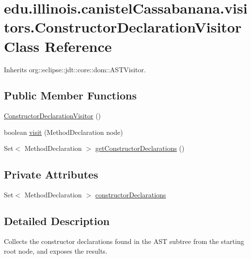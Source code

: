 \hypertarget{classedu_1_1illinois_1_1canistelCassabanana_1_1visitors_1_1ConstructorDeclarationVisitor}{
\section{edu.illinois.canistelCassabanana.visitors.ConstructorDeclarationVisitor Class Reference}
\label{classedu_1_1illinois_1_1canistelCassabanana_1_1visitors_1_1ConstructorDeclarationVisitor}
}


Inherits org::eclipse::jdt::core::dom::ASTVisitor.

\subsection*{Public Member Functions}
\begin{DoxyCompactItemize}
\item 
\hyperlink{classedu_1_1illinois_1_1canistelCassabanana_1_1visitors_1_1ConstructorDeclarationVisitor_ac5d0769146e570f94a92eb59f92f57c8}{ConstructorDeclarationVisitor} ()
\item 
boolean \hyperlink{classedu_1_1illinois_1_1canistelCassabanana_1_1visitors_1_1ConstructorDeclarationVisitor_afafd417f2801c19676e2d7c1b1b53b26}{visit} (MethodDeclaration node)
\item 
Set$<$ MethodDeclaration $>$ \hyperlink{classedu_1_1illinois_1_1canistelCassabanana_1_1visitors_1_1ConstructorDeclarationVisitor_a013cd441eb841119c3e29e0c669f6cb8}{getConstructorDeclarations} ()
\end{DoxyCompactItemize}
\subsection*{Private Attributes}
\begin{DoxyCompactItemize}
\item 
Set$<$ MethodDeclaration $>$ \hyperlink{classedu_1_1illinois_1_1canistelCassabanana_1_1visitors_1_1ConstructorDeclarationVisitor_a1b3b20e50f658bd0b2e3e8b189fc3119}{constructorDeclarations}
\end{DoxyCompactItemize}


\subsection{Detailed Description}
Collects the constructor declarations found in the AST subtree from the starting root node, and exposes the results.

